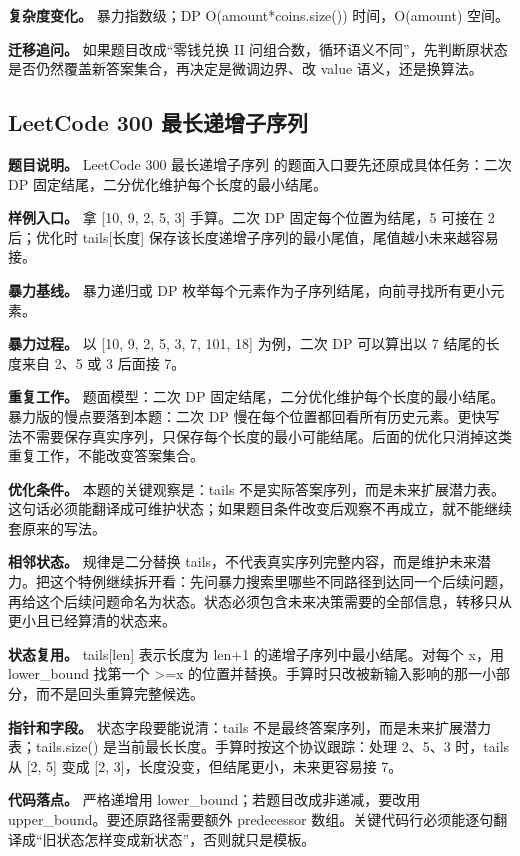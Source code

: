 \textbf{复杂度变化。} 暴力指数级；DP O(amount*coins.size()) 时间，O(amount) 空间。

\textbf{迁移追问。} 如果题目改成“零钱兑换 II 问组合数，循环语义不同”，先判断原状态是否仍然覆盖新答案集合，再决定是微调边界、改 value 语义，还是换算法。

\subsection{LeetCode 300 最长递增子序列}

\textbf{题目说明。} LeetCode 300 最长递增子序列 的题面入口要先还原成具体任务：二次 DP 固定结尾，二分优化维护每个长度的最小结尾。

\textbf{样例入口。} 拿 [10, 9, 2, 5, 3] 手算。二次 DP 固定每个位置为结尾，5 可接在 2 后；优化时 tails[长度] 保存该长度递增子序列的最小尾值，尾值越小未来越容易接。

\textbf{暴力基线。} 暴力递归或 DP 枚举每个元素作为子序列结尾，向前寻找所有更小元素。

\textbf{暴力过程。} 以 [10, 9, 2, 5, 3, 7, 101, 18] 为例，二次 DP 可以算出以 7 结尾的长度来自 2、5 或 3 后面接 7。

\textbf{重复工作。} 题面模型：二次 DP 固定结尾，二分优化维护每个长度的最小结尾。暴力版的慢点要落到本题：二次 DP 慢在每个位置都回看所有历史元素。更快写法不需要保存真实序列，只保存每个长度的最小可能结尾。后面的优化只消掉这类重复工作，不能改变答案集合。

\textbf{优化条件。} 本题的关键观察是：tails 不是实际答案序列，而是未来扩展潜力表。这句话必须能翻译成可维护状态；如果题目条件改变后观察不再成立，就不能继续套原来的写法。

\textbf{相邻状态。} 规律是二分替换 tails，不代表真实序列完整内容，而是维护未来潜力。把这个特例继续拆开看：先问暴力搜索里哪些不同路径到达同一个后续问题，再给这个后续问题命名为状态。状态必须包含未来决策需要的全部信息，转移只从更小且已经算清的状态来。

\textbf{状态复用。} tails[len] 表示长度为 len+1 的递增子序列中最小结尾。对每个 x，用 lower\_bound 找第一个 >=x 的位置并替换。手算时只改被新输入影响的那一小部分，而不是回头重算完整候选。

\textbf{指针和字段。} 状态字段要能说清：tails 不是最终答案序列，而是未来扩展潜力表；tails.size() 是当前最长长度。手算时按这个协议跟踪：处理 2、5、3 时，tails 从 [2, 5] 变成 [2, 3]，长度没变，但结尾更小，未来更容易接 7。

\textbf{代码落点。} 严格递增用 lower\_bound；若题目改成非递减，要改用 upper\_bound。要还原路径需要额外 predecessor 数组。关键代码行必须能逐句翻译成“旧状态怎样变成新状态”，否则就只是模板。


